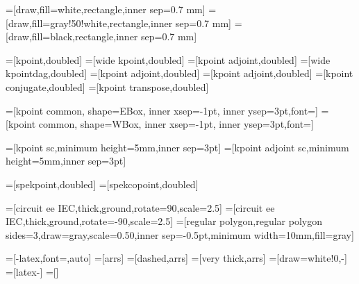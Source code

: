 =[draw,fill=white,rectangle,inner sep=0.7 mm]
=[draw,fill=gray!50!white,rectangle,inner sep=0.7 mm]
=[draw,fill=black,rectangle,inner sep=0.7 mm]

=[kpoint,doubled]
=[wide kpoint,doubled]
=[kpoint adjoint,doubled]
=[wide kpointdag,doubled]
=[kpoint adjoint,doubled]
=[kpoint adjoint,doubled]
=[kpoint conjugate,doubled]
=[kpoint transpose,doubled]

=[kpoint common, shape=EBox, inner xsep=-1pt, inner ysep=3pt,font=\small]
=[kpoint common, shape=WBox, inner xsep=-1pt, inner ysep=3pt,font=\small]

=[kpoint sc,minimum height=5mm,inner sep=3pt]
=[kpoint adjoint sc,minimum height=5mm,inner sep=3pt]

=[spekpoint,doubled]
=[spekcopoint,doubled]



 =[circuit ee IEC,thick,ground,rotate=90,scale=2.5]
 =[circuit ee IEC,thick,ground,rotate=-90,scale=2.5]
 =[regular polygon,regular polygon sides=3,draw=gray,scale=0.50,inner sep=-0.5pt,minimum width=10mm,fill=gray]


=[-latex,font=\small,auto]
=[arrs]
=[dashed,arrs]
=[very thick,arrs]
=[draw=white!0,-]
=[latex-]
=[]



